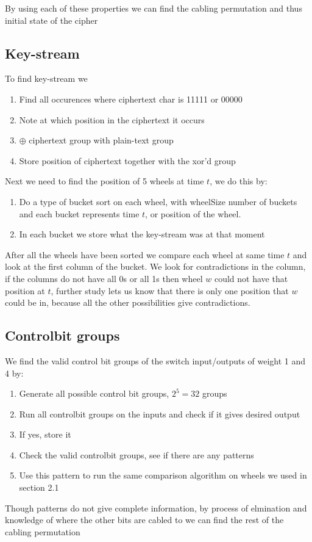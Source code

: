 \documentclass{article}
\begin{document}
By using each of these properties we can find the cabling permutation and thus initial state of the cipher

\subsection{Key-stream}

To find key-stream we
\begin{enumerate}
	\item Find all occurences where ciphertext char is 11111 or 00000
	\item Note at which position in the ciphertext it occurs
	\item $\oplus$ ciphertext group with plain-text group
	\item Store position of ciphertext together with the xor'd group
\end{enumerate}

Next we need to find the position of 5 wheels at time $t$, we do this by:
\begin{enumerate}
	\item Do a type of bucket sort on each wheel, with wheelSize number of buckets and each bucket represents time $t$, or position of the wheel.
	\item In each bucket we store what the key-stream was at that moment
\end{enumerate}

After all the wheels have been sorted we compare each wheel at same time $t$ and look at the first column of the bucket. We look for contradictions in the column, if the columns do not have all 0s or all 1s then wheel $w$ could not have that position at $t$, further study lets us know that there is only one position that $w$ could be in, because all the other possibilities give contradictions.

\subsection{Controlbit groups}

We find the valid control bit groups of the switch input/outputs of weight 1 and 4 by:
\begin{enumerate}
	\item Generate all possible control bit groups, $2^{5} = 32$ groups
	\item Run all controlbit groups on the inputs and check if it gives desired output
	\item If yes, store it
	\item Check the valid controlbit groups, see if there are any patterns
	\item Use this pattern to run the same comparison algorithm on wheels we used in section 2.1
\end{enumerate}

Though patterns do not give complete information, by process of elmination and knowledge of where the other bits are cabled to we can find the rest of the cabling permutation
\end{document}
